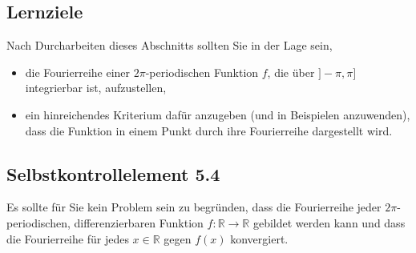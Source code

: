 \documentclass[a4paper,12pt]{article}
\begin{document}
\begin{center}
\end{center}

\subsection*{Lernziele}

Nach Durcharbeiten dieses Abschnitts sollten Sie in der Lage sein,
\begin{itemize}
  \item die Fourierreihe einer $2\pi$-periodischen Funktion $f$, die über
        $]-\pi, \pi]$ integrierbar ist, aufzustellen,
  \item ein hinreichendes Kriterium dafür anzugeben (und in Beispielen
        anzuwenden), dass die Funktion in einem Punkt durch ihre Fourierreihe
        dargestellt wird.
\end{itemize}

\subsection*{Selbstkontrollelement 5.4}

Es sollte für Sie kein Problem sein zu begründen, dass die Fourierreihe jeder
$2\pi$-periodischen, differenzierbaren Funktion $f: \mathbb{R} \to \mathbb{R}$
gebildet werden kann und dass die Fourierreihe für jedes $x \in \mathbb{R}$
gegen $f(x)$ konvergiert.
\end{document}
